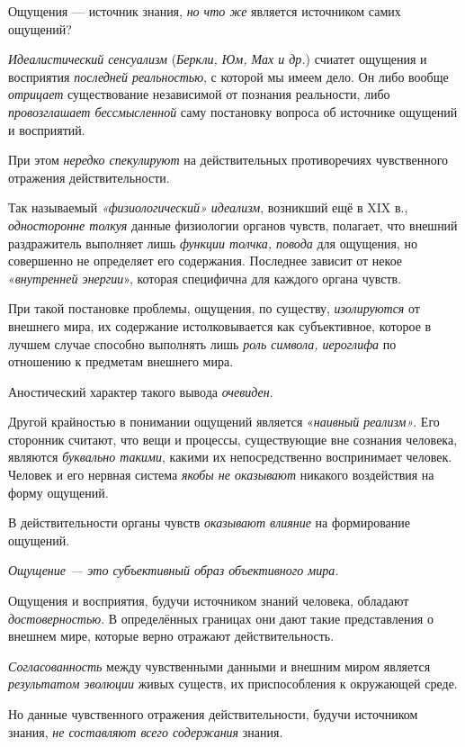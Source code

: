 \documentclass[a4paper,14pt,russian]{extreport}
\begin{document}
Ощущения --- источник знания, \emph{но что же} является источником самих ощущений?

\emph{Идеалистический сенсуализм} (\emph{Беркли, Юм, Мах и др.}) счиатет ощущения и восприятия \emph{последней реальностью}, с которой мы имеем дело. Он либо вообще \emph{отрицает} существование независимой от познания реальности, либо \emph{провозглашает бессмысленной} саму постановку вопроса об источнике ощущений и восприятий.

При этом \emph{нередко спекулируют} на действительных противоречиях чувственного отражения действительности.

Так называемый \emph{«физиологический» идеализм}, возникший ещё в XIX в., \emph{односторонне толкуя} данные физиологии органов чувств, полагает, что внешний раздражитель выполняет лишь \emph{функции толчка, повода} для ощущения, но совершенно не определяет его содержания. Последнее зависит от некое «\emph{внутренней энергии}», которая специфична для каждого органа чувств.

При такой постановке проблемы, ощущения, по существу, \emph{изолируются} от внешнего мира, их содержание истолковывается как субъективное, которое в лучшем случае способно выполнять лишь \emph{роль символа, иероглифа} по отношению к предметам внешнего мира.

Аностический характер такого вывода \emph{очевиден}.

Другой крайностью в понимании ощущений является «\emph{наивный реализм»}. Его сторонник считают, что вещи и процессы, существующие вне сознания человека, являются \emph{буквально такими}, какими их непосредственно воспринимает человек. Человек и его нервная система \emph{якобы не оказывают} никакого воздействия на форму ощущений.

В действительности органы чувств \emph{оказывают влияние} на формирование ощущений.

\emph{Ощущение --- это субъективный образ объективного мира.}

Ощущения и восприятия, будучи источником знаний человека, обладают \emph{достоверностью}. В определённых границах они дают такие представления о внешнем мире, которые верно отражают действительность.

\emph{Согласованность} между чувственными данными и внешним миром является \emph{результатом эволюции} живых существ, их приспособления к окружающей среде.

Но данные чувственного отражения действительности, будучи источником знания, \emph{не составляют всего содержания} знания.
\end{document}
